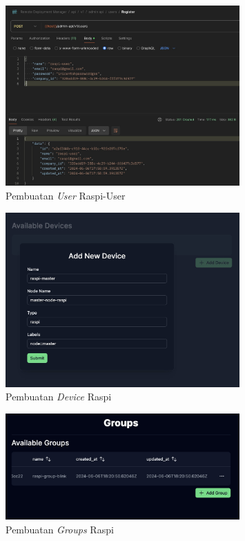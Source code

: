 \begin{figure}[ht]
  \centering
  \includegraphics[width=0.8\textwidth]{resources/chapter-4/pengujian/pengujian-sistem-raspi-02.jpg}
  \caption{Pembuatan \textit{User} Raspi-User}
  \label{fig:pengujian-sistem-raspi-02}
\end{figure}

\begin{figure}[ht]
  \centering
  \includegraphics[width=0.8\textwidth]{resources/chapter-4/pengujian/pengujian-sistem-raspi-04-1.jpg}
  \caption{Pembuatan \textit{Device} Raspi}
  \label{fig:pengujian-sistem-raspi-04}
\end{figure}

\begin{figure}[ht]
  \centering
  \includegraphics[width=0.8\textwidth]{resources/chapter-4/pengujian/pengujian-sistem-raspi-05.jpg}
  \caption{Pembuatan \textit{Groups} Raspi}
  \label{fig:pengujian-sistem-raspi-05}
\end{figure}

